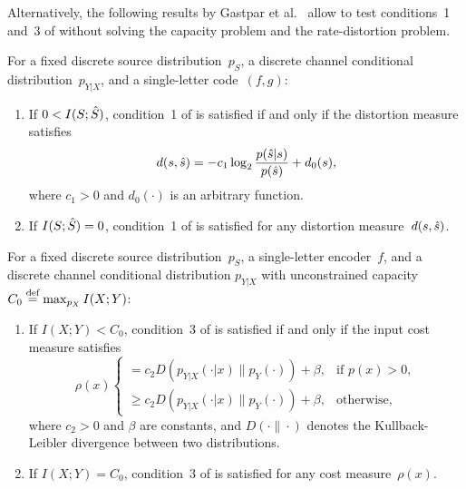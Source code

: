 Alternatively, the following results by Gastpar et al.~\cite[Lemmas~2.2
and~2.3]{GastparRV2003} allow to test conditions~1 and~3 of
 without solving the capacity problem and the
rate-distortion problem.

\begin{lemma}
  \label{lem:gastparrd}
  For a fixed discrete source distribution~$p_S$, a discrete channel conditional
  distribution~$p_{Y|X}$, and a single-letter code~$(f,g)$:
  \begin{enumerate}
    \item If $0 < I(S; {\hat{S}})$, condition~1 of  is satisfied
      if and only if the distortion measure satisfies
      \begin{equation}
        \label{eq:rdmatch}
        d(s,{\hat{s}}) = -c_1 \log_2 \frac{p({\hat{s}}|s)}{p({\hat{s}})} + d_0(s),
      \end{equation}
      where $c_1 > 0$ and $d_0(\cdot)$ is an arbitrary function. 

    \item If $I(S;{\hat{S}}) = 0$, condition~1 of  is satisfied
      for any distortion measure~$d(s,{\hat{s}})$.
  \end{enumerate}
\end{lemma}

\begin{lemma}
  \label{lem:gastparcost}
  For a fixed discrete source distribution~$p_S$, a single-letter encoder~$f$,
  and a discrete channel conditional distribution $p_{Y|X}$ with unconstrained
  capacity $C_0 \stackrel{\text{def}}{=} \max_{p_X} I(X;Y)$:
  \begin{enumerate}
    \item If $I(X;Y) < C_0$, condition~3 of  is satisfied
      if and only if the input cost measure satisfies
      \begin{equation}
        \label{eq:costmatch}
        \rho(x)
        \begin{cases}
          = c_2 D(p_{Y|X}(\cdot|x) \| p_Y(\cdot)) + \beta, & 
          \text{if $p(x) > 0$}, \\
          \ge c_2 D(p_{Y|X}(\cdot|x) \| p_Y(\cdot)) + \beta, &
          \text{otherwise,}
        \end{cases}
      \end{equation}
      where $c_2 > 0$ and $\beta$ are constants, and $D(\cdot\|\cdot)$ denotes
      the Kullback-Leibler divergence between two distributions.

    \item If $I(X;Y) = C_0$, condition~3 of  is satisfied
      for any cost measure~$\rho(x)$.
  \end{enumerate}
\end{lemma}

